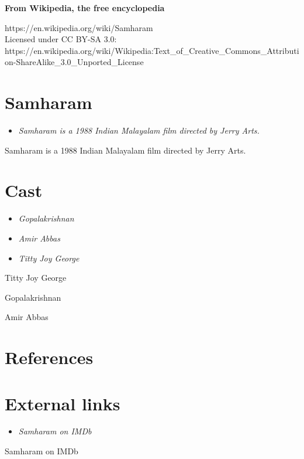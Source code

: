 \textbf{From Wikipedia, the free encyclopedia}

https://en.wikipedia.org/wiki/Samharam\\
Licensed under CC BY-SA 3.0:\\
https://en.wikipedia.org/wiki/Wikipedia:Text\_of\_Creative\_Commons\_Attribution-ShareAlike\_3.0\_Unported\_License

\section{Samharam}\label{samharam}

\begin{itemize}
\item
  \emph{Samharam is a 1988 Indian Malayalam film directed by Jerry
  Arts.}
\end{itemize}

Samharam is a 1988 Indian Malayalam film directed by Jerry Arts.

\section{Cast}\label{cast}

\begin{itemize}
\item
  \emph{Gopalakrishnan}
\item
  \emph{Amir Abbas}
\item
  \emph{Titty Joy George}
\end{itemize}

Titty Joy George

Gopalakrishnan

Amir Abbas

\section{References}\label{references}

\section{External links}\label{external-links}

\begin{itemize}
\item
  \emph{Samharam on IMDb}
\end{itemize}

Samharam on IMDb
